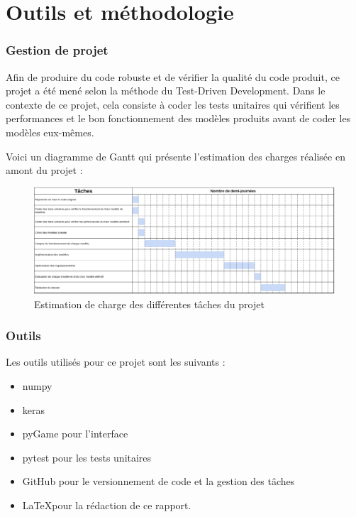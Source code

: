 \documentclass[french]{article}
\begin{document}
    \section{Outils et méthodologie}
    \subsubsection{Gestion de projet}

    Afin de produire du code robuste et de vérifier la qualité du code produit, ce projet a été mené selon la méthode du Test-Driven Development. Dans le contexte de ce projet, cela consiste à coder les tests unitaires qui vérifient les performances et le bon fonctionnement des modèles produits avant de coder les modèles eux-mêmes.
    
    Voici un diagramme de Gantt qui présente l'estimation des charges réalisée en amont du projet :

    \begin{figure}[h]
        \includegraphics[width=13cm]{gantt}
        \centering
        \caption{Estimation de charge des différentes tâches du projet}
        \centering
    \end{figure}

    \subsubsection{Outils}

    Les outils utilisés pour ce projet sont les suivants :
    \begin{itemize}
        \item numpy
        \item keras
        \item pyGame pour l'interface
        \item pytest pour les tests unitaires
        \item GitHub pour le versionnement de code et la gestion des tâches
        \item \LaTeX pour la rédaction de ce rapport.
    \end{itemize}
\end{document}
